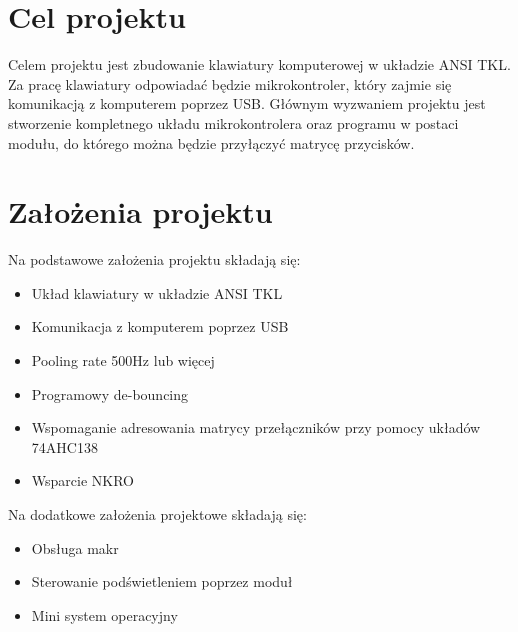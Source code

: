 \documentclass{article}
\begin{document}
\pagestyle{fancy}
    \section{Cel projektu}
    Celem projektu jest zbudowanie klawiatury komputerowej w układzie
    ANSI TKL. Za pracę klawiatury odpowiadać będzie mikrokontroler, który zajmie się 
    komunikacją z komputerem poprzez USB.
    Głównym wyzwaniem projektu jest stworzenie kompletnego układu mikrokontrolera oraz programu
    w postaci modułu, do którego można będzie przyłączyć matrycę przycisków.

    \section{Założenia projektu}
    Na podstawowe założenia projektu składają się:
        \begin{itemize}
            \item Układ klawiatury w układzie ANSI TKL
            \item Komunikacja z komputerem poprzez USB
            \item Pooling rate 500Hz lub więcej
            \item Programowy de-bouncing
            \item Wspomaganie adresowania matrycy przełączników przy pomocy układów 74AHC138
            \item Wsparcie NKRO
        \end{itemize}
    Na dodatkowe założenia projektowe składają się:
        \begin{itemize}
            \item Obsługa makr
            \item Sterowanie podświetleniem poprzez moduł
            \item Mini system operacyjny
        \end{itemize}
\end{document}
